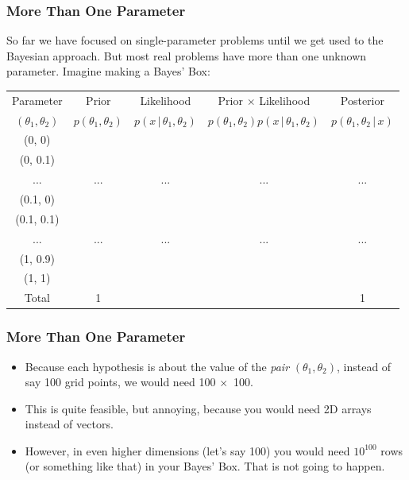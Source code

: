 \documentclass{beamer}
\newcommand{\given}{\,|\,}
\begin{document}
\begin{frame}
\frametitle{More Than One Parameter}
So far we have focused on single-parameter problems until we get used to the
Bayesian approach. But most real problems have more than one unknown parameter.
Imagine making a Bayes' Box:
\begin{center}
{\tiny
\begin{tabular}{|c|c|c|c|c|}
\hline
Parameter & Prior & Likelihood & Prior $\times$ Likelihood & Posterior \\
$(\theta_1, \theta_2)$  & $p(\theta_1, \theta_2)$ & $p(x \given \theta_1, \theta_2)$ & $p(\theta_1, \theta_2)p(x\given\theta_1, \theta_2)$ & $p(\theta_1, \theta_2\given x)$ \\
\hline
(0, 0) &  &  & & \\
(0, 0.1) &  &  & & \\
... & ... & ... & ... & ... \\
(0.1, 0) &  &  & & \\
(0.1, 0.1) & & & & \\
... & ... & ... & ... & ... \\
(1, 0.9) & & & & \\
(1, 1) & & & & \\
\hline
Total & 1 & & & 1 \\
\hline
\end{tabular}
} %
\end{center}

\end{frame}

\begin{frame}
\frametitle{More Than One Parameter}
\begin{itemize}
\item Because each hypothesis is about the value of the {\em pair}
$(\theta_1, \theta_2)$, instead of say 100 grid points, we would need
100 $\times$~100. \pause
\item This is quite feasible, but annoying, because you would need 2D arrays
instead of vectors.\pause
\item However, in even higher dimensions (let's say 100) you would need
$10^{100}$ rows (or something like that) in your Bayes' Box.
That is not going to happen.
\end{itemize}


\end{frame}
\end{document}
